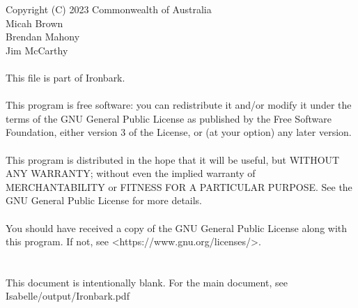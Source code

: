 \documentclass[11pt,a4paper]{article}
\begin{document}
\noindent Copyright (C) 2023 Commonwealth of Australia\\
\indent Micah Brown\\
\indent Brendan Mahony\\
\indent Jim McCarthy\\
\\
This file is part of Ironbark.\\
\\
This program is free software: you can redistribute it and/or modify it under the terms of the GNU General Public License as published by the Free Software Foundation, either version 3 of the License, or (at your option) any later version.\\
\\
This program is distributed in the hope that it will be useful, but WITHOUT ANY WARRANTY; without even the implied warranty of MERCHANTABILITY or FITNESS FOR A PARTICULAR PURPOSE. See the GNU General Public License for more details.\\
\\
You should have received a copy of the GNU General Public License along with this program. If not, see <https://www.gnu.org/licenses/>.\\
\\
\\
This document is intentionally blank. For the main document, see Isabelle/output/Ironbark.pdf\\
\\
\end{document}
